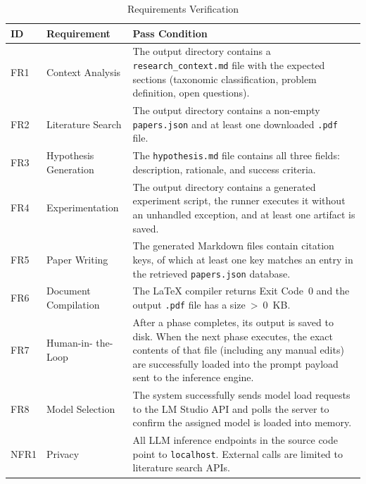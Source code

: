 \begin{table}[htbp]
    \centering
    \caption{Requirements Verification}
    \label{tab:verification}
    \begin{tabularx}{\textwidth}{l p{2.6cm} X}
        \toprule
        \textbf{ID} & \textbf{Requirement} & \textbf{Pass Condition} \\
        \midrule
        FR1 & Context \newline Analysis & The output directory contains a \texttt{research\_context.md} file with the expected sections (taxonomic classification, problem definition, open questions). \\
        FR2 & Literature \newline Search & The output directory contains a non-empty \texttt{papers.json} and at least one downloaded \texttt{.pdf} file. \\
        FR3 & Hypothesis \newline Generation & The \texttt{hypothesis.md} file contains all three fields: description, rationale, and success criteria. \\
        FR4 & Experimentation & The output directory contains a generated experiment script, the runner executes it without an unhandled exception, and at least one artifact is saved. \\
        FR5 & Paper \newline Writing & The generated Markdown files contain citation keys, of which at least one key matches an entry in the retrieved \texttt{papers.json} database. \\
        FR6 & Document \newline Compilation & The \LaTeX{} compiler returns Exit Code~0 and the output \texttt{.pdf} file has a size~>~0~KB. \\
        FR7 & Human-in- \newline the-Loop & After a phase completes, its output is saved to disk. When the next phase executes, the exact contents of that file (including any manual edits) are successfully loaded into the prompt payload sent to the inference engine. \\
        FR8 & Model \newline Selection & The system successfully sends model load requests to the LM Studio API and polls the server to confirm the assigned model is loaded into memory. \\
        NFR1 & Privacy & All LLM inference endpoints in the source code point to \texttt{localhost}. External calls are limited to literature search APIs. \\

\end{tabularx}
\end{table}

